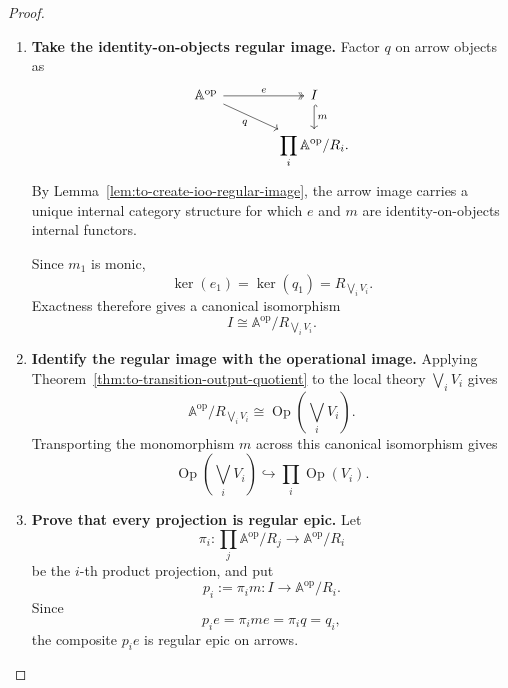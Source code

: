 \begin{proof}
\begin{enumerate}
        \item \textbf{Take the identity-on-objects regular image.}
        Factor \(q\) on arrow objects as
        \[
        \begin{tikzcd}[column sep=large]
            \mathbb A^{\mathrm{op}}
                \arrow[r, two heads, "e"]
                \arrow[dr, "q"']
            &
            I
                \arrow[d, hook, "m"]
            \\
            &
            \displaystyle
            \prod_i
            \mathbb A^{\mathrm{op}}/R_i.
        \end{tikzcd}
        \]
        By
        Lemma~\ref{lem:to-create-ioo-regular-image},
        the arrow image carries a unique internal category structure for
        which \(e\) and \(m\) are identity-on-objects internal functors.

        Since \(m_1\) is monic,
        \[
            \ker(e_1)
            =
            \ker(q_1)
            =
            R_{\bigvee_iV_i}.
        \]
        Exactness therefore gives a canonical isomorphism
        \[
            I
            \cong
            \mathbb A^{\mathrm{op}}
            /
            R_{\bigvee_iV_i}.
        \]

        \item \textbf{Identify the regular image with the operational image.}
        Applying
        Theorem~\ref{thm:to-transition-output-quotient}
        to the local theory \(\bigvee_iV_i\) gives
        \[
            \mathbb A^{\mathrm{op}}
            /
            R_{\bigvee_iV_i}
            \cong
            \operatorname{Op}
            \left(
                \bigvee_iV_i
            \right).
        \]
        Transporting the monomorphism \(m\) across this canonical
        isomorphism gives
        \[
            \operatorname{Op}
            \left(
                \bigvee_iV_i
            \right)
            \hookrightarrow
            \prod_i
            \operatorname{Op}(V_i).
        \]

        \item \textbf{Prove that every projection is regular epic.}
        Let
        \[
            \pi_i:
            \prod_j
            \mathbb A^{\mathrm{op}}/R_j
            \to
            \mathbb A^{\mathrm{op}}/R_i
        \]
        be the \(i\)-th product projection, and put
        \[
            p_i:=\pi_i m:
            I\to
            \mathbb A^{\mathrm{op}}/R_i.
        \]
        Since
        \[
            p_i e
            =
            \pi_i m e
            =
            \pi_i q
            =
            q_i,
        \]
        the composite \(p_i e\) is regular epic on arrows.


\end{enumerate}
\end{proof}
